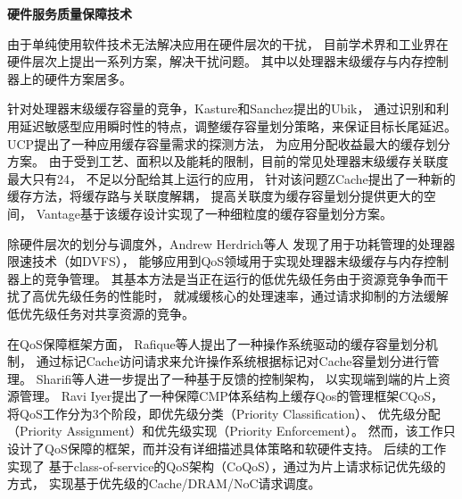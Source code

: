 \textbf{硬件服务质量保障技术}\quad

由于单纯使用软件技术无法解决应用在硬件层次的干扰，
目前学术界和工业界在硬件层次上提出一系列方案，解决干扰问题。
其中以处理器末级缓存与内存控制器上的硬件方案居多。

针对处理器末级缓存容量的竞争，Kasture和Sanchez提出的Ubik\cite{kasture_ubik:_2014}，
通过识别和利用延迟敏感型应用瞬时性的特点，调整缓存容量划分策略，来保证目标长尾延迟。
UCP\cite{qureshi_utility-based_2006}提出了一种应用缓存容量需求的探测方法，
为应用分配收益最大的缓存划分方案。
由于受到工艺、面积以及能耗的限制，目前的常见处理器末级缓存关联度最大只有24，
不足以分配给其上运行的应用，
针对该问题ZCache\cite{sanchez_zcache:_2010}提出了一种新的缓存方法，将缓存路与关联度解耦，
提高关联度为缓存容量划分提供更大的空间，
Vantage\cite{sanchez_vantage:_2011}基于该缓存设计实现了一种细粒度的缓存容量划分方案。



除硬件层次的划分与调度外，Andrew Herdrich等人\cite{herdrich_rate-based_2009}
发现了用于功耗管理的处理器限速技术（如DVFS），
能够应用到QoS领域用于实现处理器末级缓存与内存控制器上的竞争管理。
其基本方法是当正在运行的低优先级任务由于资源竞争争而干扰了高优先级任务的性能时，
就减缓核心的处理速率，通过请求抑制的方法缓解低优先级任务对共享资源的竞争。

在QoS保障框架方面，
Rafique等人提出了一种操作系统驱动的缓存容量划分机制\cite{Rafique:2006:ASO}，
通过标记Cache访问请求来允许操作系统根据标记对Cache容量划分进行管理。
Sharifi等人进一步提出了一种基于反馈的控制架构\cite{sharifi_mete:_2011}，
以实现端到端的片上资源管理。
Ravi Iyer提出了一种保障CMP体系结构上缓存Qos的管理框架CQoS\cite{iyer_cqos:_2004}，
将QoS工作分为3个阶段，即优先级分类（Priority Classification）、
优先级分配（Priority Assignment）和优先级实现（Priority Enforcement）。
然而，该工作只设计了QoS保障的框架，而并没有详细描述具体策略和软硬件支持。
后续的工作\cite{iyer_qos_2007, li_coqos:_2011, li_dynamic_2012}实现了
基于class-of-service的QoS架构（CoQoS），通过为片上请求标记优先级的方式，
实现基于优先级的Cache/DRAM/NoC请求调度。

\fi
